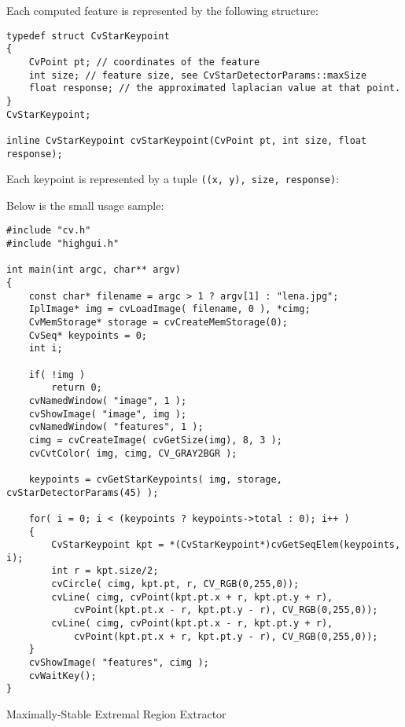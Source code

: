\ifC
Each computed feature is represented by the following structure:

\begin{lstlisting}
typedef struct CvStarKeypoint
{
    CvPoint pt; // coordinates of the feature
    int size; // feature size, see CvStarDetectorParams::maxSize
    float response; // the approximated laplacian value at that point.
}
CvStarKeypoint;

inline CvStarKeypoint cvStarKeypoint(CvPoint pt, int size, float response);
\end{lstlisting}
\else
Each keypoint is represented by a tuple \texttt{((x, y), size, response)}:
\begin{description}
\end{description}
\fi

\ifC
Below is the small usage sample:

\begin{lstlisting}
#include "cv.h"
#include "highgui.h"

int main(int argc, char** argv)
{
    const char* filename = argc > 1 ? argv[1] : "lena.jpg";
    IplImage* img = cvLoadImage( filename, 0 ), *cimg;
    CvMemStorage* storage = cvCreateMemStorage(0);
    CvSeq* keypoints = 0;
    int i;

    if( !img )
        return 0;
    cvNamedWindow( "image", 1 );
    cvShowImage( "image", img );
    cvNamedWindow( "features", 1 );
    cimg = cvCreateImage( cvGetSize(img), 8, 3 );
    cvCvtColor( img, cimg, CV_GRAY2BGR );

    keypoints = cvGetStarKeypoints( img, storage, cvStarDetectorParams(45) );

    for( i = 0; i < (keypoints ? keypoints->total : 0); i++ )
    {
        CvStarKeypoint kpt = *(CvStarKeypoint*)cvGetSeqElem(keypoints, i);
        int r = kpt.size/2;
        cvCircle( cimg, kpt.pt, r, CV_RGB(0,255,0));
        cvLine( cimg, cvPoint(kpt.pt.x + r, kpt.pt.y + r),
            cvPoint(kpt.pt.x - r, kpt.pt.y - r), CV_RGB(0,255,0));
        cvLine( cimg, cvPoint(kpt.pt.x - r, kpt.pt.y + r),
            cvPoint(kpt.pt.x + r, kpt.pt.y - r), CV_RGB(0,255,0));
    }
    cvShowImage( "features", cimg );
    cvWaitKey();
}
\end{lstlisting}
\fi

\fi
\ifCpp

Maximally-Stable Extremal Region Extractor

